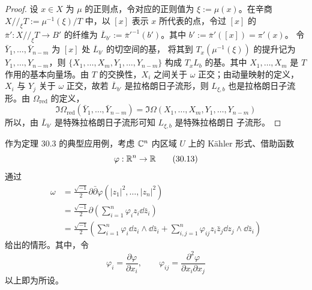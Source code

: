 \begin{proof}
设 $x \in X$ 为 $\mu$ 的正则点，令对应的正则值为 $\xi := \mu(x)$。在辛商
$X/\!/_{\xi}T := \mu^{-1}(\xi)/T$ 中，以 $[x]$ 表示 $x$ 所代表的点，令过 $[x]$
的 $\bar\pi': X/\!/_{\xi}T \to B'$ 的纤维为
$\overline{L}_{b'} := \bar\pi'^{-1}(b')$。其中 $b' := \bar\pi'([x]) = \pi'(x)$。
令 $\bar Y_1,\dots,\bar Y_{n-m}$ 为 $[x]$ 处 $\overline{L}_{b'}$ 的切空间的基，
将其到 $T_x(\mu^{-1}(\xi))$ 的提升记为 $Y_1,\dots,Y_{n-m}$，则
$\{X_1,\dots,X_m,Y_1,\dots,Y_{n-m}\}$ 构成 $T_xL_b$ 的基。其中
$X_1,\dots,X_m$ 是 $T$ 作用的基本向量场。由 $T$ 的交换性，$X_i$ 之间关于
$\omega$ 正交；由动量映射的定义，$X_i$ 与 $Y_j$ 关于 $\omega$ 正交，故若
$\overline{L}_{b'}$ 是拉格朗日子流形，则 $L_{\xi,b}$ 也是拉格朗日子流形。由
$\Omega_{\mathrm{red}}$ 的定义，
\begin{equation}
  \Im\Omega_{\mathrm{red}}(\bar Y_1,\dots,\bar Y_{n-m})
  = \Im\Omega(X_1,\dots,X_m,Y_1,\dots,Y_{n-m}) \tag{30.12}
\end{equation}
所以，由 $\overline{L}_{b'}$ 是特殊拉格朗日子流形可知 $L_{\xi,b}$ 是特殊拉格朗日
子流形。
\end{proof}


作为定理 30.3 的典型应用例，考虑 $\mathbb{C}^n$ 内区域 $U$ 上的 Kähler 形式、借助函数
\begin{equation}
  \varphi: \mathbb{R}^n \to \mathbb{R} \tag{30.13}
\end{equation}
通过
\begin{align}
  \omega &= \frac{\sqrt{-1}}{2}\partial\bar\partial\varphi
    (|z_1|^2,\dots,|z_n|^2) \tag{30.14}\\
  &= \frac{\sqrt{-1}}{2}\partial\left(\sum_{i=1}^{n}\varphi_i z_i\dd\bar z_i\right) \tag{30.15}\\
  &= \frac{\sqrt{-1}}{2}\left(\sum_{i=1}^{n}\varphi_i\dd z_i\wedge \dd\bar z_i
    + \sum_{i,j=1}^{n}\varphi_{ij}z_i\bar z_j\dd z_j\wedge \dd\bar z_i\right) \tag{30.16}
\end{align}
\begin{equation}
  \mbox{} \tag{30.17}
\end{equation}
给出的情形。其中，令
\begin{equation}
  \varphi_i = \frac{\partial\varphi}{\partial x_i}, \qquad
  \varphi_{ij} = \frac{\partial^2\varphi}{\partial x_i\partial x_j} \tag{30.18}
\end{equation}
以上即为所设。


